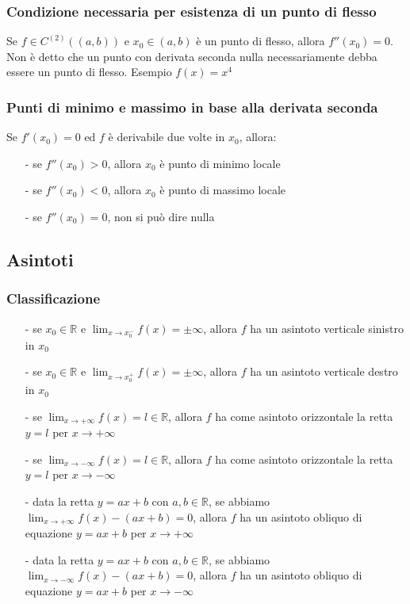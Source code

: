 \documentclass[a4paper]{article}
\newcommand\cont[2]{C^{(#1)} \left({#2}\right)}
\begin{document}
\subsubsection*{Condizione necessaria per esistenza di un punto di flesso}
Se \(f \in \cont{2}{\left(a, b\right)}\) e \(x_0 \in \left(a, b\right)\) è un punto di flesso, allora \(f''(x_0) = 0\). Non è
detto che un punto con derivata seconda nulla necessariamente debba essere un punto di flesso. Esempio \(f(x) = x^4\)

\subsubsection*{Punti di minimo e massimo in base alla derivata seconda}
Se \(f'(x_0) = 0\) ed \(f\) è derivabile due volte in \(x_0\), allora:
\begin{itemize} [topsep=3pt, itemsep=0pt]
	\item[-] se \(f''(x_0) > 0\), allora \(x_0\) è punto di minimo locale
	\item[-] se \(f''(x_0) < 0\), allora \(x_0\) è punto di massimo locale
	\item[-] se \(f''(x_0) = 0\), non si può dire nulla
\end{itemize}


\subsection{Asintoti}
\subsubsection*{Classificazione}
\begin{itemize}
	\item[-] se \(x_0 \in \mathbb{R}\) e \(\displaystyle \lim_{x \to x_0^-} f(x) = \pm \infty\), allora \(f\) ha un asintoto verticale sinistro in \(x_0\)
	\item[-] se \(x_0 \in \mathbb{R}\) e \(\displaystyle \lim_{x \to x_0^+} f(x) = \pm \infty\), allora \(f\) ha un asintoto verticale destro in \(x_0\)
	\item[-] se \(\displaystyle \lim_{x \to + \infty} f(x) = l \in \mathbb{R}\), allora \(f\) ha come asintoto orizzontale la retta \(y = l\) per \(x \to + \infty\)
	\item[-] se \(\displaystyle \lim_{x \to - \infty} f(x) = l \in \mathbb{R}\), allora \(f\) ha come asintoto orizzontale la retta \(y = l\) per \(x \to - \infty\)
	\item[-] data la retta \(y = ax + b\) con \(a,b \in \mathbb{R}\), se abbiamo \(\displaystyle \lim_{x \to + \infty} f(x) - \left(ax + b\right) = 0\), allora
	\(f\) ha un asintoto obliquo di equazione \(y = ax + b\) per \(x \to + \infty\)
	\item[-] data la retta \(y = ax + b\) con \(a,b \in \mathbb{R}\), se abbiamo \(\displaystyle \lim_{x \to - \infty} f(x) - \left(ax + b\right) = 0\), allora
	\(f\) ha un asintoto obliquo di equazione \(y = ax + b\) per \(x \to - \infty\)
\end{itemize}
\end{document}
